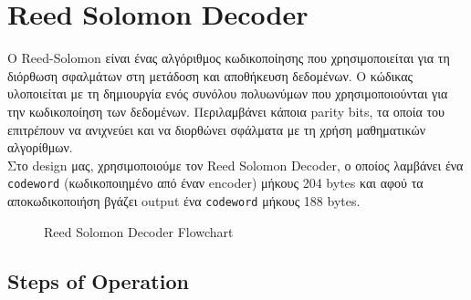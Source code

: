 \documentclass[12pt,a4paper]{article}
\begin{document}
    \section{\textcolor{PineGreen}{Reed Solomon Decoder}}
    Ο Reed-Solomon είναι ένας αλγόριθμος κωδικοποίησης που χρησιμοποιείται για τη διόρθωση σφαλμάτων στη μετάδοση και αποθήκευση δεδομένων. Ο κώδικας υλοποιείται με τη δημιουργία ενός συνόλου πολυωνύμων που χρησιμοποιούνται για την κωδικοποίηση των δεδομένων. Περιλαμβάνει κάποια parity bits, τα οποία του επιτρέπουν να ανιχνεύει και να διορθώνει σφάλματα με τη χρήση μαθηματικών αλγορίθμων.\\
    Στο design μας, χρησιμοποιούμε τον Reed Solomon Decoder, ο οποίος λαμβάνει ένα \verb|codeword| (κωδικοποιημένο από έναν encoder) μήκους 204 bytes και αφού τα αποκωδικοποιήση βγάζει output ένα \verb|codeword| μήκους 188 bytes.
    \begin{figure} [H]
     	\caption{Reed Solomon Decoder Flowchart}
     	\label{Reed Solomon Decoder Flowchart}
     \end{figure}
    
    \subsection{\textcolor{PineGreen}{Steps of Operation}}
    
\end{document}
